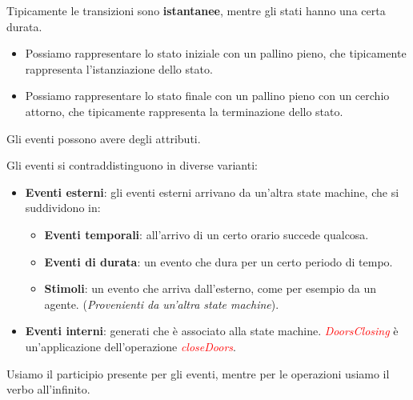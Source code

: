 Tipicamente le transizioni sono \textbf{istantanee}, mentre 
gli stati hanno una certa durata.
\begin{itemize}
    \item Possiamo rappresentare lo stato iniziale con un pallino pieno, che tipicamente 
    rappresenta l'istanziazione dello stato.
    \item Possiamo rappresentare lo stato finale con un pallino pieno con un cerchio attorno,
    che tipicamente rappresenta la terminazione dello stato.
\end{itemize}
Gli eventi possono avere degli attributi.
\begin{figure}[H]
    \centering
\end{figure}
Gli eventi si contraddistinguono in diverse varianti:
\begin{itemize}
    \item \textbf{Eventi esterni}: gli eventi esterni arrivano da un'altra state machine,
    che si suddividono in:
    \begin{itemize}
        \item \textbf{Eventi temporali}: all'arrivo di un certo orario succede qualcosa. 
        \item \textbf{Eventi di durata}: un evento che dura per un certo periodo di tempo.
        \item \textbf{Stimoli}: un evento che arriva dall'esterno, come per esempio da un
        agente. (\textit{Provenienti da un'altra state machine}).
    \end{itemize}
    \item \textbf{Eventi interni}: generati che è associato alla state machine.
    \textit{\textcolor{red}{DoorsClosing}} è un'applicazione dell'operazione
    \textcolor{red}{\textit{closeDoors}}.
\end{itemize}
\begin{tcolorbox}
    Usiamo il participio presente per gli eventi, mentre per le operazioni usiamo il
    verbo all'infinito.
\end{tcolorbox}
